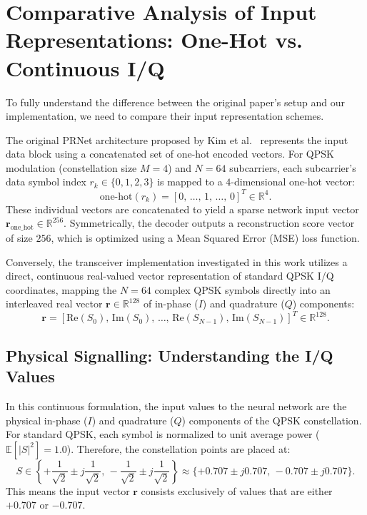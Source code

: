 \section{Comparative Analysis of Input Representations: One-Hot vs. Continuous I/Q}
\label{sec:representation_comparison}

To fully understand the difference between the original paper's setup and our implementation, we need to compare their input representation schemes.

The original PRNet architecture proposed by Kim et al.~\cite{kim2017novel} represents the input data block using a concatenated set of one-hot encoded vectors. For QPSK modulation (constellation size $M=4$) and $N=64$ subcarriers, each subcarrier's data symbol index $r_k \in \{0, 1, 2, 3\}$ is mapped to a $4$-dimensional one-hot vector:
\begin{equation*}
    \text{one-hot}(r_k) = [0,\, \dots,\, 1,\, \dots,\, 0]^T \in \mathbb{R}^4.
\end{equation*}
These individual vectors are concatenated to yield a sparse network input vector $\bm{r}_{\mathrm{one\_hot}} \in \mathbb{R}^{256}$. Symmetrically, the decoder outputs a reconstruction score vector of size $256$, which is optimized using a Mean Squared Error (MSE) loss function.

Conversely, the transceiver implementation investigated in this work utilizes a direct, continuous real-valued vector representation of standard QPSK I/Q coordinates, mapping the $N=64$ complex QPSK symbols directly into an interleaved real vector $\bm{r} \in \mathbb{R}^{128}$ of in-phase ($I$) and quadrature ($Q$) components:
\begin{equation*}
    \bm{r} = \left[\mathrm{Re}(S_0),\, \mathrm{Im}(S_0),\, \dots,\, \mathrm{Re}(S_{N-1}),\, \mathrm{Im}(S_{N-1})\right]^T \in \mathbb{R}^{128}.
\end{equation*}

\subsection{Physical Signalling: Understanding the I/Q Values}
In this continuous formulation, the input values to the neural network are the physical in-phase ($I$) and quadrature ($Q$) components of the QPSK constellation. For standard QPSK, each symbol is normalized to unit average power ($\mathbb{E}[|S|^2] = 1.0$). Therefore, the constellation points are placed at:
\begin{equation*}
    S \in \left\{ +\frac{1}{\sqrt{2}} \pm j \frac{1}{\sqrt{2}},\, -\frac{1}{\sqrt{2}} \pm j \frac{1}{\sqrt{2}} \right\} \approx \{ +0.707 \pm j 0.707,\, -0.707 \pm j 0.707 \}.
\end{equation*}
This means the input vector $\bm{r}$ consists exclusively of values that are either $+0.707$ or $-0.707$. 

